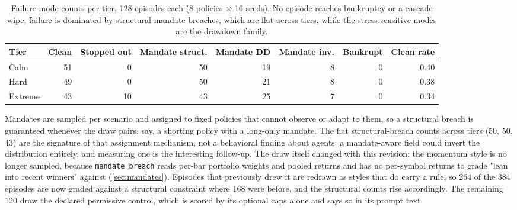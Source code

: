 \begin{table}[t]
\centering
\caption{Failure-mode counts per tier, 128 episodes each (8 policies $\times$ 16 seeds). No episode reaches bankruptcy or a cascade wipe; failure is dominated by structural mandate breaches, which are flat across tiers, while the stress-sensitive modes are the drawdown family.}
\label{tab:f7}
\small
\setlength{\tabcolsep}{5pt}
\begin{tabular}{lrrrrrrr}
\toprule
Tier & Clean & Stopped out & Mandate struct. & Mandate DD & Mandate inv. & Bankrupt & Clean rate \\
\midrule
Calm & 51 & 0 & 50 & 19 & 8 & 0 & 0.40 \\
Hard & 49 & 0 & 50 & 21 & 8 & 0 & 0.38 \\
Extreme & 43 & 10 & 43 & 25 & 7 & 0 & 0.34 \\
\bottomrule
\end{tabular}
\end{table}

Mandates are sampled per scenario and assigned to fixed policies that cannot observe or adapt to them, so a structural breach is guaranteed whenever the draw pairs, say, a shorting policy with a long-only mandate. The flat structural-breach counts across tiers (50, 50, 43) are the signature of that assignment mechanism, not a behavioral finding about agents; a mandate-aware field could invert the distribution entirely, and measuring one is the interesting follow-up. The draw itself changed with this revision: the momentum style is no longer sampled, because \texttt{mandate\_breach} reads per-bar portfolio weights and pooled returns and has no per-symbol returns to grade "lean into recent winners" against (\cref{sec:mandates}). Episodes that previously drew it are redrawn as styles that do carry a rule, so 264 of the 384 episodes are now graded against a structural constraint where 168 were before, and the structural counts rise accordingly. The remaining 120 draw the declared permissive control, which is scored by its optional caps alone and says so in its prompt text.

